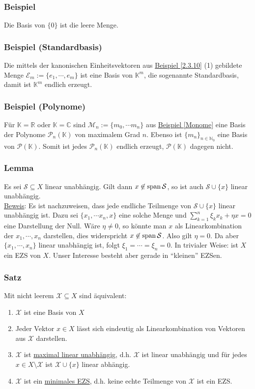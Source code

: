 \subsubsection{Beispiel}
Die Basis von $\{0\}$ ist die leere Menge.
\subsubsection{Beispiel (Standardbasis)}
\label{standardbasis}
Die mittels der kanonischen Einheitsvektoren aus \hyperref[2.3.10]{Beispiel \ref*{2.3.10}} (1) gebildete Menge $\mathcal{E}_m:=\{e_1,\cdots ,e_m\}$ ist eine Basis von $\mathbb{K}^m$, die sogenannte Standardbasis, damit ist $\mathbb{K}^m$ endlich erzeugt.
\subsubsection{Beispiel (Polynome)}
\label{2.4.4}
Für $\mathbb{K}=\mathbb{R}$ oder $\mathbb{K}=\mathbb{C}$ sind $\mathcal{M}_n:=\{m_0,\cdots m_n\}$ aus \hyperref[Monome]{Beispiel \ref*{Monome}} eine Basis der Polynome $\mathcal{P}_n(\mathbb{K})$ von maximalem Grad $n$.  Ebenso ist $\{m_n\}_{n\in\mathbb{N}_0}$ eine Basis von $\mathcal{P}(\mathbb{K})$.  Somit ist jedes $\mathcal{P}_n(\mathbb{K})$ endlich erzeugt, $\mathcal{P}(\mathbb{K})$ dagegen nicht.
\subsubsection{Lemma}
Es sei $\mathcal{S}\subseteq X$ linear unabhängig.  Gilt dann $x\not\in\operatorname{span}\mathcal{S}$, so ist auch $\mathcal{S}\cup\{x\}$ linear unabhängig. \\
\underline{Beweis}:  Es ist nachzuweisen, dass jede endliche Teilmenge von $\mathcal{S}\cup\{x\}$ linear unabhängig ist.  Dazu sei $\{x_1,\cdots x_n,x\}$ eine solche Menge und $\sum_{k=1}^n \xi _k x_k +\eta x=0$ eine Darstellung der Null.  Wäre $\eta \not= 0$, so könnte man $x$ als Linearkombination der $x_1,\cdots ,x_n$ darstellen, dies widerspricht $x\not\in\operatorname{span}\mathcal{S}$.  Also gilt $\eta = 0$.  Da aber $\{x_1,\cdots ,x_n\}$ linear unabhängig ist, folgt $\xi _1 = \cdots = \xi _n = 0$.  In trivialer Weise: ist $X$ ein EZS von $X$.  Unser Interesse besteht aber gerade in "`kleinen"' EZSen.
\subsubsection{Satz}
\label{2.4.6}
Mit nicht leerem $\mathcal{X}\subseteq X$ sind äquivalent:
\renewcommand{\labelenumi}{(\alph{enumi})}
\begin{enumerate}
\item $\mathcal{X}$ ist eine Basis von $X$
\item Jeder Vektor $x\in X$ lässt sich eindeutig als Linearkombination von Vektoren aus $\mathcal{X}$ darstellen.
\item $\mathcal{X}$ ist \underline{maximal linear unabhängig}, d.h. $\mathcal{X}$ ist linear unabhängig und für jedes $x\in X\setminus \mathcal{X}$ ist $\mathcal{X}\cup\{x\}$ linear abhängig.
\item $\mathcal{X}$ ist ein \underline{minimales EZS}, d.h. keine echte Teilmenge von $\mathcal{X}$ ist ein EZS.
\end{enumerate}
